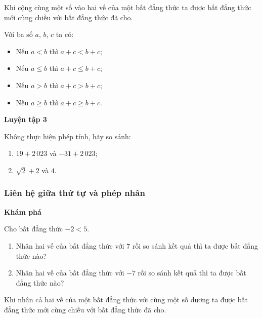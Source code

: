 \begin{lesson}
\begin{enumerate}[label=\alph*)]
        \answerline
    \end{enumerate}

    \begin{keyconcept}
        Khi cộng cùng một số vào hai vế của một bất đẳng thức ta được bất đẳng thức mới cùng chiều với bất đẳng thức đã cho.

        Với ba số $a$, $b$, $c$ ta có:
        \begin{itemize}
            \item Nếu $a<b$ thì $a+c<b+c$;
            \item Nếu $a\le b$ thì $a+c\le b+c$;
            \item Nếu $a>b$ thì $a+c>b+c$;
            \item Nếu $a\ge b$ thì $a+c\ge b+c$.
        \end{itemize}
    \end{keyconcept}

    \textbf{Luyện tập 3}

    Không thực hiện phép tính, hãy so sánh:
    \begin{enumerate}[label=\alph*)]
        \item $19+2\,023$ và $-31+2\,023$;

        \answerline
        \item $\sqrt{2}+2$ và $4$.

        \answerline
    \end{enumerate}

    \subsubsection{Liên hệ giữa thứ tự và phép nhân}

    \textbf{Khám phá}

    Cho bất đẳng thức $-2<5$.
    \begin{enumerate}[label=\alph*)]
        \item Nhân hai vế của bất đẳng thức với $7$ rồi so sánh kết quả thì ta được bất đẳng thức nào?

        \answerline
        \item Nhân hai vế của bất đẳng thức với $-7$ rồi so sánh kết quả thì ta được bất đẳng thức nào?

        \answerline
    \end{enumerate}

    \begin{keyconcept}
        Khi nhân cả hai vế của một bất đẳng thức với cùng một số dương ta được bất đẳng thức mới cùng chiều với bất đẳng thức đã cho.


\end{keyconcept}
\end{lesson}
